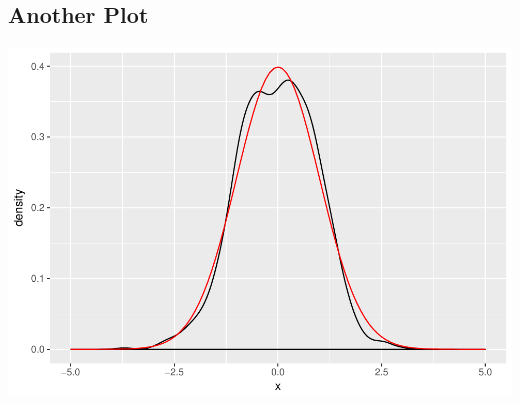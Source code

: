 \documentclass[11pt,]{article}
\begin{document}
\subsection{Another Plot}\label{another-plot}

\includegraphics{est46114_s01_algebramatricial_svm_files/figure-latex/plotit-1.pdf}




\newpage
\singlespacing 
\end{document}

